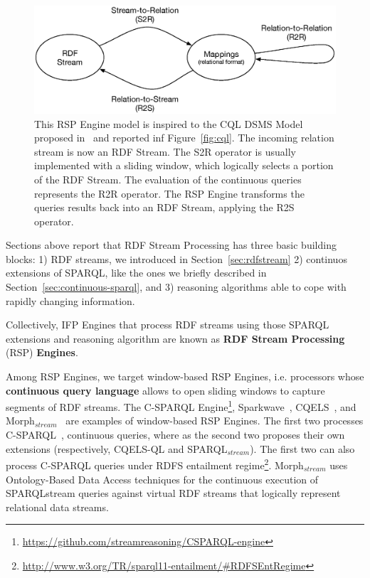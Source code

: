 \begin{figure}[tbh]
  \centering
	\includegraphics[width=\linewidth]{images/rsp-engine-model}
	\caption[RSP Engine Model]{This RSP Engine model is inspired to the CQL DSMS Model proposed in~\cite{Arasu2006} and reported inf Figure~\ref{fig:cql}. The incoming relation stream is now an RDF Stream. The S2R operator is usually implemented with a sliding window, which logically selects a portion of the RDF Stream. The evaluation of the continuous queries represents the R2R operator. The RSP Engine transforms the queries results back into an RDF Stream, applying the R2S operator.} 
  	\label{fig:rsp-engine-model}
\end{figure}

Sections above report that RDF Stream Processing has three basic building blocks: 1) RDF streams, we introduced in Section~\ref{sec:rdfstream} 2) continuos extensions of SPARQL, like the ones we briefly described in Section~\ref{sec:continuous-sparql}, and 3) reasoning algorithms able to cope with rapidly changing information.

Collectively, IFP Engines that process RDF streams using those SPARQL extensions and reasoning algorithm are known as \textbf{RDF Stream Processing} (RSP) \textbf{Engines}.

Among RSP Engines, we target window-based RSP Engines, i.e. processors whose \textbf{continuous query language} allows to open sliding windows to capture segments of RDF streams. The C-SPARQL Engine\footnote{\url{https://github.com/streamreasoning/CSPARQL-engine}}, Sparkwave~\cite{DBLP:conf/debs/KomazecCF12}, CQELS~\cite{Lephuoc2011}, and Morph$_{stream}$~\cite{DBLP:journals/ijswis/CalbimonteJCA12}  are examples of window-based RSP Engines. The first two processes C-SPARQL~\cite{Barbieri2010}, continuous queries, where as the second two proposes their own extensions (respectively, CQELS-QL and SPARQL$_{stream}$). The first two can also process C-SPARQL queries under RDFS entailment regime\footnote{\url{http://www.w3.org/TR/sparql11-entailment/#RDFSEntRegime}}. 
Morph$_{stream}$ uses Ontology-Based Data Access techniques for the continuous execution of SPARQLstream queries against virtual RDF streams that logically represent relational data streams.

